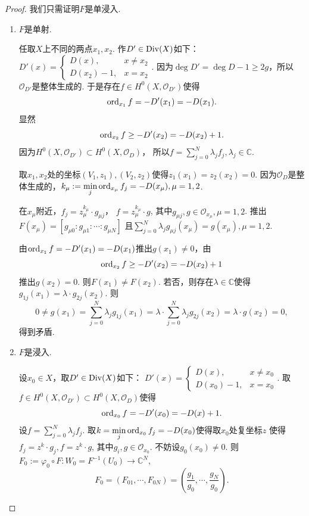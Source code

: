 \begin{proof}
    我们只需证明$F$是单浸入.
	\begin{enumerate} 
		\item[1.] $F$是单射.

		\qquad 任取$X$上不同的两点$x_1,x_2$. 作$D' \in \operatorname{Div}(X)$如下：
        $D'(x)=\begin{cases} D(x), &x\neq x_2\\ D(x_2)-1, &x=x_2\end{cases}$. 
        因为$\deg D'=\deg D-1\geq 2g$，所以$\mathcal{O}_{D'}$是整体生成的. 
        于是存在$f\in H^0(X,\mathcal{O}_{D'})$使得
		$$\operatorname{ord}_{x_1} f=-D'(x_1)=-D(x_1).$$
		显然
		$$\operatorname{ord}_{x_2} f\geq -D'(x_2)=-D(x_2)+1.$$
		因为$H^0(X,\mathcal{O}_{D'})\subset H^0(X,\mathcal{O}_D)$，
        所以$f=\sum\limits_{j=0}^N \lambda_jf_j, \lambda_j\in \mathbb{C}$.

		\qquad 取$x_1, x_2$处的坐标$(V_1,z_1), (V_2,z_2)$使得$z_1(x_1)=z_2(x_2)=0$. 
        因为$\mathcal{O}_D$是整体生成的，$k_\mu:=\min\limits_j \operatorname{ord}_{x_\mu} f_j=-D(x_\mu), \mu=1,2$.

		\qquad 在$x_\mu$附近，$f_j=z_\mu^{k_\mu}\cdot g_{\mu j}$，
        $f=z_\mu^{k_\mu} \cdot g$, 其中$g_{\mu j}, g \in \mathcal{O}_{x_\mu}, \mu=1,2$. 
        推出$F(x_\mu)=[g_{\mu 0}:g_{\mu 1}:\cdots: g_{\mu N}]$
        且$\sum\limits_{j=0}^N \lambda_j g_{\mu j} (x_\mu)=g(x_\mu), \mu=1,2$.

		\qquad 由$\operatorname{ord}_{x_1} f=-D'(x_1)=-D(x_1)$推出$g(x_1)\neq 0$，由
        \[\operatorname{ord}_{x_2} f\geq -D'(x_2)=-D(x_2)+1\]
        推出$g(x_2)=0$. 则$F(x_1)\neq F(x_2)$. 
        若否，则存在$\lambda\in \mathbb{C}$使得$g_{1 j}(x_1)=\lambda \cdot g_{2 j}(x_2) $. 则	
		$$0\neq g(x_1)=\sum\limits_{j=0}^N \lambda_j g_{1 j}(x_1)
        =\lambda \cdot \sum\limits_{j=0}^N \lambda_j g_{2 j}(x_2)
        =\lambda \cdot g(x_2)=0,$$
		得到矛盾.
		
        \item[2.] $F$是浸入.

		\qquad 设$x_0\in X$，取$D'\in \operatorname{Div}(X)$如下：
        $D'(x)=\begin{cases} D(x), &x\neq x_0\\ D(x_0)-1, &x=x_0\end{cases}$. 
        取$f\in H^0(X,\mathcal{O}_{D'})\subset H^0(X,\mathcal{O}_D)$使得
		$$\operatorname{ord}_{x_0}f=-D'(x_0)=-D(x)+1.$$
		\qquad 设$f=\sum\limits_{j=0}^N \lambda_j f_j$. 
        取$k=\min\limits_j \operatorname{ord}_{x_0}f_j=-D(x_0)$使得取$x_0$处复坐标$z$
        使得$f_j=z^k\cdot g_j, f=z^k \cdot g$, 其中$g_i,g\in \mathcal{O}_{x_0}$. 
        不妨设$g_0(x_0)\neq 0$. 则$F_0:=\varphi_0\circ F\colon W_0=F^{-1}(U_0)\rightarrow \mathbb{C}^N$,
		$$F_0=(F_{01},\cdots,F_{0N})=\left(\frac{g_1}{g_0},\cdots,\frac{g_N}{g_0}\right).$$


\end{enumerate}
\end{proof}

